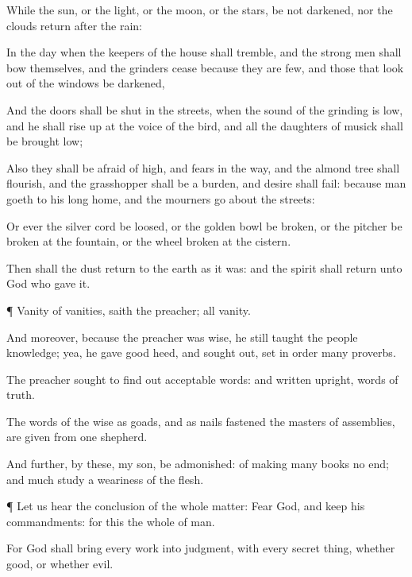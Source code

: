 {While the
sun, or the
light, or the
moon, or the
stars, be not
darkened, nor the
clouds
return
after the
rain:

In the
day when the
keepers of the
house shall
tremble, and the
strong
men shall
bow themselves, and the
grinders
cease because they are
few, and those that look
out of the
windows be
darkened,

And the
doors shall be
shut in the
streets, when the
sound of the
grinding is
low, and he shall rise
up at the
voice of the
bird, and all the
daughters of
musick shall be brought
low;

Also
{} they shall be
afraid of
{}
high, and
fears
{} in the
way, and the almond
tree shall
flourish, and the
grasshopper shall be a
burden, and
desire shall
fail: because
man
goeth to his
long
home, and the
mourners go
about the
streets:

Or
ever the
silver
cord be
loosed, or the
golden
bowl be
broken, or the
pitcher be
broken at the
fountain, or the
wheel
broken at the
cistern.

Then shall the
dust
return to the
earth as it was: and the
spirit shall
return unto
God who
gave it.


\par }{\PP {}¶
Vanity of
vanities,
saith the
preacher; all
{}
vanity.

And
moreover, because the
preacher was
wise, he still
taught the
people
knowledge; yea, he gave good
heed, and sought
out,
{} set in
order
many
proverbs.

The
preacher
sought to find
out
acceptable
words: and
{}
written
{}
upright,
{}
words of
truth.

The
words of the
wise
{} as
goads, and as
nails
fastened
{} the
masters of
assemblies,
{} are
given from
one
shepherd.

And
further, by
these, my
son, be
admonished: of
making
many
books
{} no
end; and
much
study
{} a
weariness of the
flesh.


\par }{\PP {}¶ Let us
hear the
conclusion of the whole
matter:
Fear
God, and
keep his
commandments: for this
{} the whole
{} of
man.

For
God shall
bring every
work into
judgment, with every secret
thing, whether
{}
good, or whether
{}
evil.


\par }